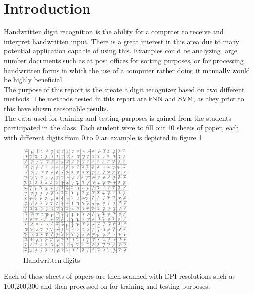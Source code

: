 \section{Introduction}
Handwritten digit recognition is the ability for a computer to receive and 
interpret handwritten input. There is a great interest in this area due to many 
potential application capable of using this. Examples could be analyzing large 
number documents such as at post offices for sorting purposes, or for processing 
handwritten forms in which the use of a computer rather doing it manually would 
be highly beneficial.  \\

The purpose of this report is the create a digit recognizer based on two 
different methods.  The methods tested in this report are kNN and SVM, as they 
prior to this have shown reasonable results.\\

The data used for training and testing purposes is gained from the students 
participated in the class.  Each student were to fill out 10 sheets of paper, 
each with different digits from 0 to 9 an example is depicted in figure 
\ref{fig:handwriten_digits}. 

\begin{figure}[H]
\centering
\includegraphics[width = 0.5\textwidth]{img/cropY2016G2M1-100-7.png}
\caption{Handwritten digits}
\label{fig:handwriten_digits}
\end{figure}

Each of these sheets of papers are then scanned with DPI resolutions such as 
100,200,300 and then processed on for training and testing purposes. 
\newpage
